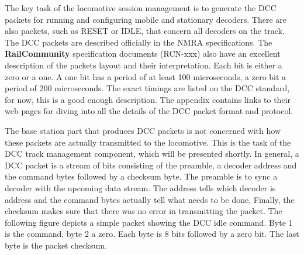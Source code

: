 The key task of the locomotive session management is to generate the DCC packets for running and configuring mobile and stationary decoders. There are also packets, such as RESET or IDLE, that concern all decoders on the track. The DCC packets are described officially in the NMRA specifications. The \textbf{RailCommunity} specification documents (RCN-xxx) also have an excellent description of the packets layout and their interpretation. Each bit is either a zero or a one. A one bit has a period of at least 100 microseconds, a zero bit a period of 200 microseconds. The exact timings are listed on the DCC standard, for now, this is a good enough description. The appendix contains links to their web pages for diving into all the details of the DCC packet format and protocol.

The base station part that produces DCC packets is not concerned with how these packets are actually transmitted to the locomotive. This is the task of the DCC track management component, which will be presented shortly. In general, a DCC packet is a stream of bits consisting of the preamble, a decoder address and the command bytes followed by a checksum byte. The preamble is to sync a decoder with the upcoming data stream. The address tells which decoder is address and the command bytes actually tell what needs to be done. Finally, the checksum makes sure that there was no error in transmitting the packet. The following figure depicts a simple packet showing the DCC idle command. Byte 1 is the command, byte 2 a zero. Each byte is 8 bits followed by a zero bit. The last byte is the packet checksum.

